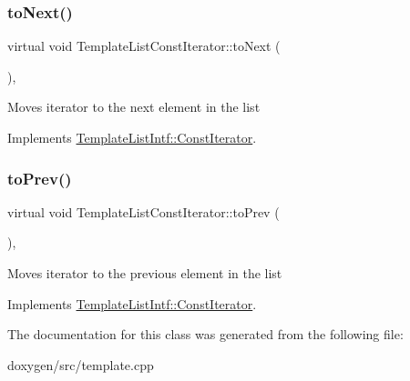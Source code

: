 \subsubsection{\texorpdfstring{toNext()}{toNext()}}
{\footnotesize\ttfamily virtual void Template\+List\+Const\+Iterator\+::to\+Next (\begin{DoxyParamCaption}{ }\end{DoxyParamCaption})\hspace{0.3cm}{\ttfamily [inline]}, {\ttfamily [virtual]}}

Moves iterator to the next element in the list 

Implements \mbox{\hyperlink{class_template_list_intf_1_1_const_iterator_a8656b1ee10ba2625ba91eadb78f8faf7}{Template\+List\+Intf\+::\+Const\+Iterator}}.

\mbox{\label{class_template_list_const_iterator_a80276f5474320de67b93f287cdd6cd79}} 
\subsubsection{\texorpdfstring{toPrev()}{toPrev()}}
{\footnotesize\ttfamily virtual void Template\+List\+Const\+Iterator\+::to\+Prev (\begin{DoxyParamCaption}{ }\end{DoxyParamCaption})\hspace{0.3cm}{\ttfamily [inline]}, {\ttfamily [virtual]}}

Moves iterator to the previous element in the list 

Implements \mbox{\hyperlink{class_template_list_intf_1_1_const_iterator_a9e5ce362eb61eb772df5afefa5703510}{Template\+List\+Intf\+::\+Const\+Iterator}}.



The documentation for this class was generated from the following file\+:\begin{DoxyCompactItemize}
\item 
doxygen/src/template.\+cpp\end{DoxyCompactItemize}
